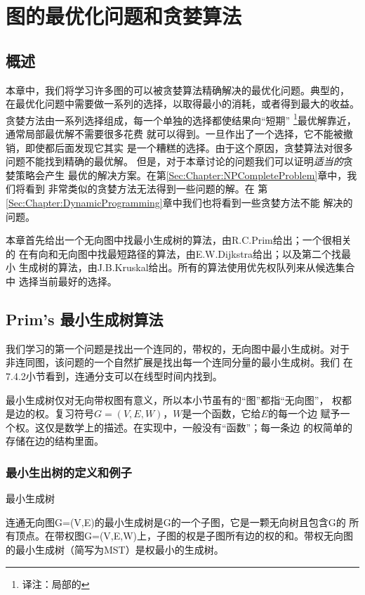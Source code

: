 \chapter{图的最优化问题和贪婪算法}\label{Sec:Chap8}
\section{概述}
本章中，我们将学习许多图的可以被贪婪算法精确解决的最优化问题。典型的，
在最优化问题中需要做一系列的选择，以取得最小的消耗，或者得到最大的收益。
贪婪方法由一系列选择组成，每一个单独的选择都使结果向“短期”
\footnote{译注：局部的}最优解靠近，通常局部最优解不需要很多花费
就可以得到。一旦作出了一个选择，它不能被撤销，即使都后面发现它其实
是一个糟糕的选择。由于这个原因，贪婪算法对很多问题不能找到精确的最优解。
但是，对于本章讨论的问题我们可以证明\emph{适当的}贪婪策略会产生
最优的解决方案。在第\ref{Sec:Chapter:NPCompleteProblem}章中，我们将看到
非常类似的贪婪方法无法得到一些问题的解。在
第\ref{Sec:Chapter:DynamicProgramming}章中我们也将看到一些贪婪方法不能
解决的问题。

本章首先给出一个无向图中找最小生成树的算法，由R.C.Prim给出；一个很相关的
在有向和无向图中找最短路径的算法，由E.W.Dijkstra给出；以及第二个找最小
生成树的算法，由J.B.Kruskal给出。所有的算法使用优先权队列来从候选集合中
选择当前最好的选择。

\section{Prim's 最小生成树算法}\label{Sec:PrimMST}
我们学习的第一个问题是找出一个连同的，带权的，无向图中最小生成树。对于
非连同图，该问题的一个自然扩展是找出每一个连同分量的最小生成树。我们
在7.4.2小节看到，连通分支可以在线型时间内找到。

最小生成树仅对无向带权图有意义，所以本小节虽有的“图”都指“无向图”，
权都是边的权。复习符号$G=(V, E, W)$，$W$是一个函数，它给$E$的每一个边
赋予一个权。这仅是数学上的描述。在实现中，一般没有“函数”；每一条边
的权简单的存储在边的结构里面。


\subsection{最小生出树的定义和例子}
\begin{definition}
最小生成树

连通无向图G=(V,E)的最小生成树是G的一个子图，它是一颗无向树且包含G的
所有顶点。在带权图G=(V,E,W)上，子图的权是子图所有边的权的和。带权无向图
的最小生成树（简写为MST）是权最小的生成树。
\end{definition}

